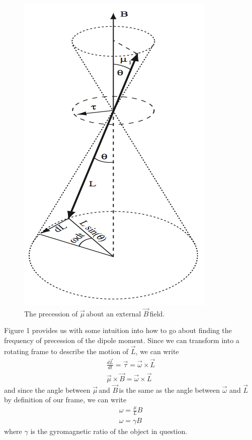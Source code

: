 \documentclass{article}
\newcommand{\dipole}{$\vec{\mu}\,$}
\newcommand{\B}{$\vec{B}\,$}
\begin{document}
	\begin{figure}[!htb]
		\centering
		\includegraphics[scale=.5]{../figures/torque}
		\caption{The precession of \dipole about an external \B field.}
	\end{figure}

	Figure 1 provides us with some intuition into how to go about finding the frequency of precession of the dipole moment.  Since we can transform into a rotating frame to describe the motion of $\vec{L}$, we can write
	\begin{gather*}
		\frac{d\vec{L}}{dt} = \vec{\tau} = \vec{\omega} \times \vec{L}\\
		\vec{\mu} \times \vec{B} = \vec{\omega} \times \vec{L}
	\end{gather*}
	and since the angle between \dipole and \B is the same as the angle between $\vec{\omega}$ and $\vec{L}$ by definition of our frame, we can write 
	\begin{gather}
		\omega = \frac{\mu}{L}B\\
		\omega = \gamma B
	\end{gather}
	where $\gamma$ is the gyromagnetic ratio of the object in question.
\end{document}
